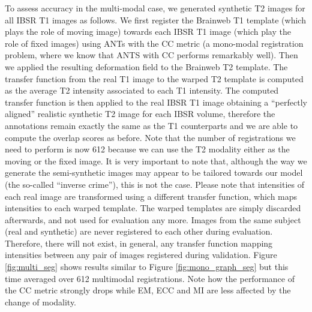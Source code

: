 To assess accuracy in the multi-modal case, we generated synthetic T2 images for all IBSR T1 images as follows. We first register the Brainweb T1 template (which plays the role of moving image) towards each IBSR T1 image (which play the role of fixed images) using ANTs with the CC metric (a mono-modal registration problem, where we know that ANTS with CC performs remarkably well). Then we applied the resulting deformation field to the Brainweb T2 template. The transfer function from the real T1 image to the warped T2 template is computed as the average T2 intensity associated to each T1 intensity. The computed transfer function is then applied to the real IBSR T1 image obtaining a ``perfectly aligned'' realistic synthetic T2 image for each IBSR volume, therefore the annotations remain exactly the same as the T1 counterparts and we are able to compute the overlap scores as before. Note that the number of registrations we need to perform is now 612 because we can use the T2 modality either as the moving or the fixed image. It is very important to note that, although the way we generate the semi-synthetic images may appear to be tailored towards our model (the so-called ``inverse crime''), this is not the case. Please note that intensities of each real image are transformed using a different transfer function, which maps intensities to each warped template. The warped templates are simply discarded afterwards, and not used for evaluation any more. Images from the same subject (real and synthetic) are never registered to each other during evaluation. Therefore, there will not exist, in general, any transfer function mapping intensities between any pair of images registered during validation. Figure \ref{fig:multi_seg} shows results similar to Figure \ref{fig:mono_graph_seg} but this time averaged over 612 multimodal registrations. Note how the performance of the CC metric strongly drops while EM, ECC and MI are less affected by the change of modality.\\

